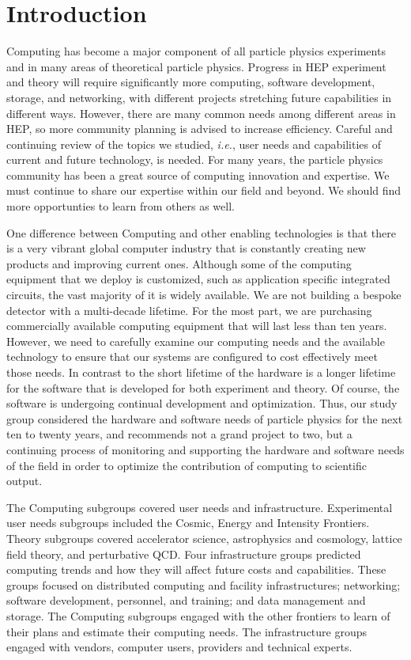

\section{Introduction}

Computing has become a major component of all particle physics experiments
and in many areas of theoretical particle physics. 
Progress in HEP experiment and theory will require significantly more
computing, software development, storage, and networking, with different
projects stretching future capabilities in different ways.  However, there
are many common needs among different areas in HEP, so more
community planning is advised to increase efficiency.
Careful and continuing review of the topics we studied, 
{\it i.e.}, user needs and capabilities of
current and future technology, is needed.  For many years, the particle physics
community has been a great source of computing innovation and expertise. 
We must continue to share our expertise within our field and beyond.
We should find more opportunties to learn from others as well.

One difference between Computing and other enabling technologies is that there is
a very vibrant global computer industry that is constantly creating new products
and improving current ones.  Although some of the computing equipment that we deploy
is customized, such as application specific integrated circuits, the vast
majority of it is widely available.  We are not building a bespoke detector with
a multi-decade lifetime.  For the most part, we are purchasing commercially available
computing equipment that will last less than ten years.  However, we need to
carefully examine our computing needs and the available technology
to ensure that our systems are configured to cost effectively meet those needs.
In contrast to the short lifetime of the hardware is a longer lifetime for the
software that is developed for both experiment and theory.  Of course, the software
is undergoing continual development and optimization.  Thus, our study group
considered the hardware and software needs of particle physics for the next
ten to twenty years, and recommends not a grand project to two, but a continuing
process of monitoring and supporting the hardware and software needs of the field
in order to optimize the contribution of computing to scientific output.

The Computing 
subgroups covered user needs and infrastructure.
Experimental user needs subgroups included the Cosmic, Energy and Intensity Frontiers.
Theory subgroups covered accelerator science,
astrophysics and cosmology, lattice field theory, and perturbative QCD.
Four infrastructure groups predicted computing trends and
how they will affect future costs and
capabilities. These groups focused on distributed computing and facility
infrastructures; networking; software development, personnel, and training; and
data management and storage. 
The Computing
subgroups engaged with the other frontiers to learn of
their plans and estimate their computing needs.  The infrastructure groups
engaged with vendors, computer users, providers and technical experts. 

